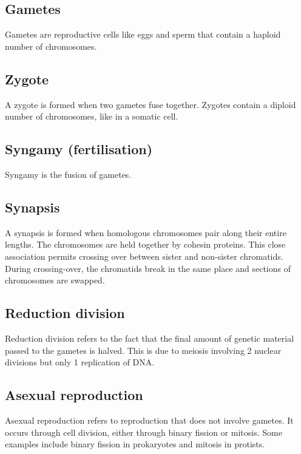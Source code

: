 \documentclass[11pt]{article}
\begin{document}
\subsection{Gametes}
\label{sec:org175fb53}
Gametes are reproductive cells like eggs and sperm that contain a haploid number of chromosomes.

\subsection{Zygote}
\label{sec:orgce861c8}
A zygote is formed when two gametes fuse together. Zygotes contain a diploid number of chromosomes, like in a somatic cell.

\subsection{Syngamy (fertilisation)}
\label{sec:org5e5659e}
Syngamy is the fusion of gametes.

\newpage

\subsection{Synapsis}
\label{sec:orgcba8002}
A synapsis is formed when homologous chromosomes pair along their entire lengths. The chromosomes are held together by cohesin proteins. This close association permits crossing over between sister and non-sister chromatids. During crossing-over, the chromatids break in the same place and sections of chromosomes are swapped.

\subsection{Reduction division}
\label{sec:org48f5098}
Reduction division refers to the fact that the final amount of genetic material passed to the gametes is halved. This is due to meiosis involving 2 nuclear divisions but only 1 replication of DNA.

\subsection{Asexual reproduction}
\label{sec:org9594b5b}
Asexual reproduction refers to reproduction that does not involve gametes. It occurs through cell division, either through binary fission or mitosis. Some examples include binary fission in prokaryotes and mitosis in protists.
\\[0pt]
\end{document}
